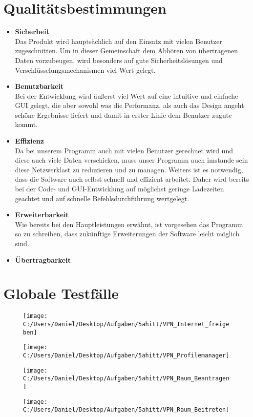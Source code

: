 \documentclass[a4paper,12pt]{scrreprt}
\begin{document}
	
	
\chapter{Qualitätsbestimmungen}
\begin{itemize}
	\item {\LARGE\textbf{Sicherheit}}\\
	Das Produkt wird hauptsächlich auf den Einsatz mit vielen Benutzer zugeschnitten. Um in dieser Gemeinschaft dem Abhören von übertragenen Daten vorzubeugen, wird besonders auf gute Sicherheitslösungen und Verschlüsselungsmechanismen viel Wert gelegt.
	\item {\LARGE\textbf{Benutzbarkeit}}\\
	Bei der Entwicklung wird äußerst viel Wert auf eine intuitive und einfache GUI gelegt, die aber sowohl was die Performanz, als auch das Design angeht schöne Ergebnisse liefert und damit in erster Linie dem Benutzer zugute kommt.
	\item {\LARGE\textbf{Effizienz}}\\
	Da bei unserem Programm auch mit vielen Benutzer gerechnet wird und diese auch viele Daten verschicken, muss unser Programm auch imstande sein diese Netzwerklast zu reduzieren und zu managen. Weiters ist es notwendig, dass die Software auch selbst schnell und effizient arbeitet. Daher wird bereits bei der Code- und GUI-Entwicklung auf möglichst geringe Ladezeiten geachtet und auf schnelle Befehlsdurchführung wertgelegt.
	\item {\LARGE\textbf{Erweiterbarkeit}}\\
	Wie bereits bei den Hauptleistungen erwähnt, ist vorgesehen das Programm so zu schreiben, dass zukünftige Erweiterungen der Software leicht möglich sind.
	\item {\LARGE\textbf{Übertragbarkeit}}	\\
	\end{itemize}
\chapter{Globale Testfälle}
	
	\begin{figure}
\centering
\texttt{[image: C:/Users/Daniel/Desktop/Aufgaben/5ahitt/VPN\_Internet\_freigeben]}
\caption{}
\label{fig:VPN_Internet_freigeben}
\end{figure}
\begin{figure}
\centering
\texttt{[image: C:/Users/Daniel/Desktop/Aufgaben/5ahitt/VPN\_Profilemanager]}
\caption{}
\label{fig:VPN_Profilemanager}
\end{figure}
\begin{figure}
\centering
\texttt{[image: C:/Users/Daniel/Desktop/Aufgaben/5ahitt/VPN\_Raum\_Beantragen]}
\caption{}
\label{fig:VPN_Raum_Beantragen}
\end{figure}
\begin{figure}
\centering
\texttt{[image: C:/Users/Daniel/Desktop/Aufgaben/5ahitt/VPN\_Raum\_Beitreten]}
\caption{}
\label{fig:VPN_Raum_Beitreten}
\end{figure}
\end{document}
